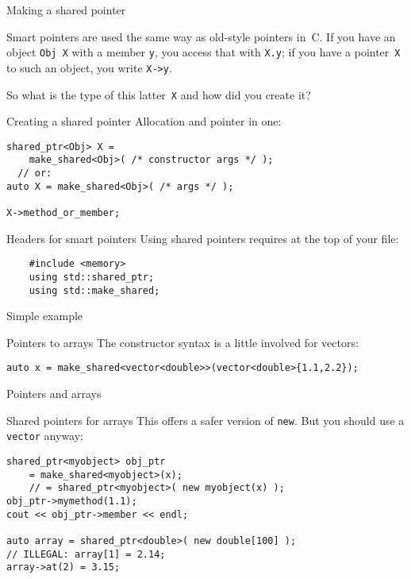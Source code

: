  {Making a shared pointer}
\label{sec:shared_ptr}

Smart pointers are used the same way as old-style pointers in~C.
If you have an
object \lstinline{Obj X} with a member \lstinline{y}, you access that with \lstinline{X.y}; if you
have a pointer~\lstinline{X} to such an object, you write \lstinline{X->y}.

So what is the type of this latter~\lstinline{X} and how did you create it?

\begin{block}{Creating a shared pointer}
  \label{sl:make-shared}
  Allocation and pointer in one:
\begin{lstlisting}
shared_ptr<Obj> X =
    make_shared<Obj>( /* constructor args */ );
  // or:
auto X = make_shared<Obj>( /* args */ );

X->method_or_member;
\end{lstlisting}
\end{block}

\begin{block}{Headers for smart pointers}
  \label{sl:pointer-header}
  Using shared pointers requires at the top of your file:
  \begin{lstlisting}
    #include <memory>
    using std::shared_ptr;
    using std::make_shared;
  \end{lstlisting}
\end{block}

\begin{block}{Simple example}
  \label{sl:shared-ptr}
\end{block}

\begin{block}{Pointers to arrays}
  \label{sl:shared-vector}
  The constructor syntax is a little involved for vectors:
\begin{lstlisting}
auto x = make_shared<vector<double>>(vector<double>{1.1,2.2});
\end{lstlisting}
\end{block}

 {Pointers and arrays}

\begin{slide}{Shared pointers for arrays}
This offers a safer version of \lstinline{new}. But you should use a
\lstinline{vector} anyway:
\begin{lstlisting}
shared_ptr<myobject> obj_ptr
    = make_shared<myobject>(x);
    // = shared_ptr<myobject>( new myobject(x) );
obj_ptr->mymethod(1.1);
cout << obj_ptr->member << endl;

auto array = shared_ptr<double>( new double[100] );
// ILLEGAL: array[1] = 2.14;
array->at(2) = 3.15;
\end{lstlisting}
\end{slide}

